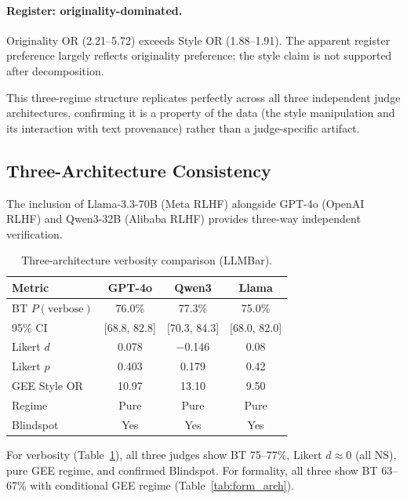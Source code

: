 \documentclass[11pt,twocolumn]{article}
\begin{document}
\paragraph{Register: originality-dominated.} Originality OR (2.21--5.72) exceeds Style OR (1.88--1.91). The apparent register preference largely reflects originality preference; the style claim is not supported after decomposition.

This three-regime structure replicates perfectly across all three independent judge architectures, confirming it is a property of the data (the style manipulation and its interaction with text provenance) rather than a judge-specific artifact.

\subsection{Three-Architecture Consistency}
\label{sec:three_arch}

The inclusion of Llama-3.3-70B (Meta RLHF) alongside GPT-4o (OpenAI RLHF) and Qwen3-32B (Alibaba RLHF) provides three-way independent verification.

\begin{table}[t]
\centering
\small
\caption{Three-architecture verbosity comparison (LLMBar).}
\label{tab:verb_arch}
\begin{tabular}{@{}lccc@{}}
\toprule
Metric & GPT-4o & Qwen3 & Llama \\
\midrule
BT $P(\text{verbose})$ & 76.0\% & 77.3\% & 75.0\% \\
95\% CI & [68.8, 82.8] & [70.3, 84.3] & [68.0, 82.0] \\
Likert $d$ & 0.078 & $-$0.146 & 0.08 \\
Likert $p$ & 0.403 & 0.179 & 0.42 \\
GEE Style OR & 10.97 & 13.10 & 9.50 \\
Regime & Pure & Pure & Pure \\
Blindspot & Yes & Yes & Yes \\
\bottomrule
\end{tabular}
\vspace{-2mm}
\end{table}

For verbosity (Table~\ref{tab:verb_arch}), all three judges show BT 75--77\%, Likert $d \approx 0$ (all NS), pure GEE regime, and confirmed Blindspot. For formality, all three show BT 63--67\% with conditional GEE regime (Table~\ref{tab:form_arch}).
\end{document}
